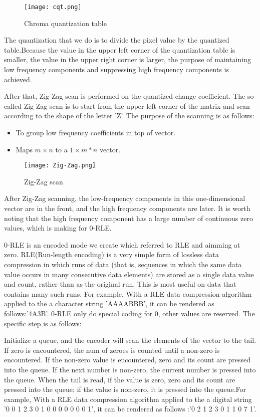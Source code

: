 \documentclass{mcmthesis}
\begin{document}
\begin{figure}[h]
\centering
\texttt{[image: cqt.png]}
\caption{Chroma quantization table} \label{fig: Chroma quantization table}
\end{figure} 

The quantization that we do is to divide the pixel value by the quantized table.Because the value in the upper left corner of the quantization table is smaller, the value in the upper right corner is larger, the purpose of maintaining low frequency components and suppressing high frequency components is achieved.

After that, Zig-Zag scan is performed on the quantized change coefficient. The so-called Zig-Zag scan is to start from the upper left corner of the matrix and scan according to the shape of the letter 'Z'. The purpose of the scanning is as follows:
\begin{itemize}
  \item To group low frequency coefficients in top of vector. 
  \item  Maps $m\times n$ to a $1\times m*n$ vector.
\end{itemize}

\begin{figure}[h]
\centering
\texttt{[image: Zig-Zag.png]}
\caption{Zig-Zag scan} \label{fig:Zig-Zag scan}
\end{figure}

After Zig-Zag scanning, the low-frequency components in this one-dimensional vector are in the front, and the high frequency components are later. It is worth noting that the high frequency component has a large number of continuous zero values, which is making for 0-RLE.

0-RLE is an encoded mode we create which referred to RLE and aimming at zero. RLE(Run-length encoding) is a very simple form of lossless data compression in which runs of data (that is, sequences in which the same data value occurs in many consecutive data elements) are stored as a single data value and count, rather than as the original run. This is most useful on data that contains many such runs. For example, With a RLE data compression algorithm applied to the a character string 'AAAABBB', it can be rendered as follows:'4A3B'. 0-RLE only do special coding for 0, other values are reserved. The specific step is as follows:

Initialize a queue, and the encoder will scan the elements of the vector to the tail. If zero is encountered, the num of zeroes is counted until a non-zero is encountered. If the non-zero value is encountered, zero and its count are pressed into the queue. If the next number is non-zero, the current number is pressed into the queue. When the tail is read, if the value is zero, zero and its count are pressed into the queue; if the value is non-zero, it is pressed into the queue.For example, With a RLE data compression algorithm applied to the a digital string '0 0 1 2 3 0 1 0 0 0 0 0 0 0 1', it can be rendered as follows :'0 2 1 2 3 0 1 1 0 7 1'.
\end{document}
